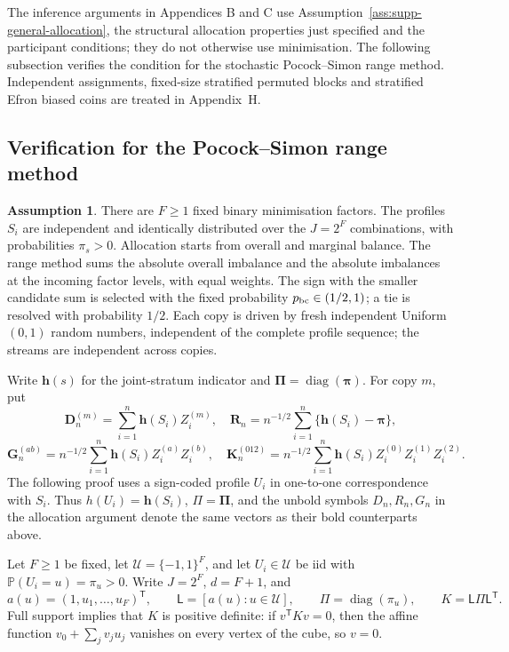 \documentclass[12pt,a4paper]{article}
\theoremstyle{definition}
\newtheorem{assumption}{Assumption}
\theoremstyle{remark}\newtheorem{remark}{Remark}
\numberwithin{equation}{section}
\newcommand{\Pp}{\mathbb P}
\newcommand{\diag}{\operatorname{diag}}
\newcommand{\trans}{^{\mathsf T}}
\begin{document}
The inference arguments in Appendices B and C use Assumption~\ref{ass:supp-general-allocation}, the structural allocation properties just specified and the participant conditions; they do not otherwise use minimisation. The following subsection verifies the condition for the stochastic Pocock--Simon range method. Independent assignments, fixed-size stratified permuted blocks and stratified Efron biased coins are treated in Appendix~H.

\subsection{Verification for the Pocock--Simon range method}\label{sec:supp-allocation}
\begin{assumption}\label{ass:supp-design}
There are $F\ge1$ fixed binary minimisation factors. The profiles $S_i$ are independent and identically distributed over the $J=2^F$ combinations, with probabilities $\pi_s>0$. Allocation starts from overall and marginal balance. The range method sums the absolute overall imbalance and the absolute imbalances at the incoming factor levels, with equal weights. The sign with the smaller candidate sum is selected with the fixed probability $p_{\rm bc}\in(1/2,1)$; a tie is resolved with probability $1/2$. Each copy is driven by fresh independent Uniform$(0,1)$ random numbers, independent of the complete profile sequence; the streams are independent across copies.
\end{assumption}
Write $\bm h(s)$ for the joint-stratum indicator and $\bm\Pi=\diag(\bm\pi)$. For copy $m$, put
\[
 \bm D_n^{(m)}=\sum_{i=1}^n\bm h(S_i)Z_i^{(m)},\quad
 \bm R_n=n^{-1/2}\sum_{i=1}^n\{\bm h(S_i)-\bm\pi\},
\]
\[
 \bm G_n^{(ab)}=n^{-1/2}\sum_{i=1}^n\bm h(S_i)Z_i^{(a)}Z_i^{(b)},\quad
 \bm K_n^{(012)}=n^{-1/2}\sum_{i=1}^n\bm h(S_i)Z_i^{(0)}Z_i^{(1)}Z_i^{(2)}.
\]
The following proof uses a sign-coded profile $U_i$ in one-to-one correspondence with $S_i$. Thus $h(U_i)=\bm h(S_i)$, $\Pi=\bm\Pi$, and the unbold symbols $D_n,R_n,G_n$ in the allocation argument denote the same vectors as their bold counterparts above.

Let $F\ge1$ be fixed, let $\mathcal U=\{-1,1\}^F$, and let $U_i\in\mathcal U$ be iid with $\Pp(U_i=u)=\pi_u>0$. Write $J=2^F$, $d=F+1$, and
\[
 a(u)=(1,u_1,\ldots,u_F)\trans,\qquad
 \mathsf L=[a(u):u\in\mathcal U],\qquad
 \Pi=\diag(\pi_u),\qquad K=\mathsf L\Pi \mathsf L\trans.
\]
Full support implies that $K$ is positive definite: if $v\trans K v=0$, then the affine function $v_0+\sum_jv_ju_j$ vanishes on every vertex of the cube, so $v=0$.
\end{document}
